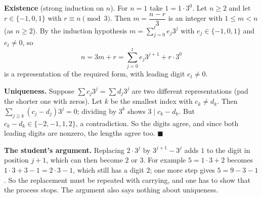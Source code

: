 \textbf{Existence} (strong induction on $n$). For $n=1$ take $1=1\cdot3^0$. Let $n\ge2$ and let $r\in\{-1,0,1\}$ with $r\equiv n\pmod3$. Then $m=\dfrac{n-r}{3}$ is an integer with $1\le m<n$ (as $n\ge2$). By the induction hypothesis $m=\sum_{j=0}^{t}e_j3^j$ with $e_j\in\{-1,0,1\}$ and $e_t\ne0$, so
\[n=3m+r=\sum_{j=0}^{t}e_j3^{j+1}+r\cdot3^0\]
is a representation of the required form, with leading digit $e_t\ne0$.

\textbf{Uniqueness.} Suppose $\sum c_j3^j=\sum d_j3^j$ are two different representations (pad the shorter one with zeros). Let $k$ be the smallest index with $c_k\ne d_k$. Then $\sum_{j\ge k}(c_j-d_j)3^j=0$; dividing by $3^k$ shows $3\mid c_k-d_k$. But $c_k-d_k\in\{-2,-1,1,2\}$, a contradiction. So the digits agree, and since both leading digits are nonzero, the lengths agree too. $\blacksquare$

\textbf{The student's argument.} Replacing $2\cdot3^j$ by $3^{j+1}-3^j$ adds $1$ to the digit in position $j+1$, which can then become $2$ or $3$. For example $5=1\cdot3+2$ becomes $1\cdot3+3-1=2\cdot3-1$, which still has a digit $2$; one more step gives $5=9-3-1$. So the replacement must be repeated with carrying, and one has to show that the process stops. The argument also says nothing about uniqueness.
